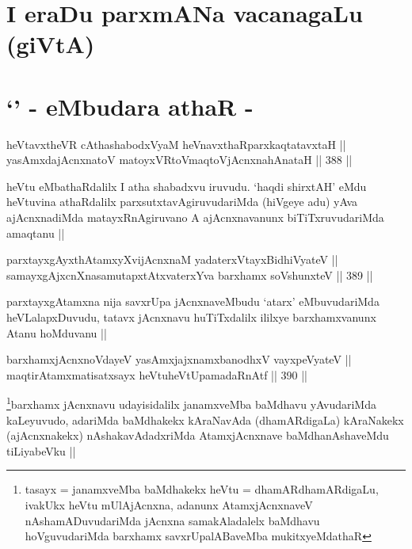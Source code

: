 \section*{I eraDu parxmANa vacanagaLu (giVtA)}

\section*{`\stext' - eMbudara athaR -}

\begin{shl}
heVtavxtheVR cAthashabodxV\s yaM heVnavxthaRparxkaqtatavxtaH || \\
yasAmxdajAcnxnatoV matoyxVR\s toV\s maqtoV\s jAcnxnahAnataH ||  388 ||  
\end{shl}

\begin{artha}
heVtu eMbathaRdalilx I atha shabadxvu iruvudu. `haqdi shirxtAH' eMdu
heVtuvina athaRdalilx parxsutxtavAgiruvudariMda (hiVgeye adu) yAva
ajAcnxnadiMda matayxRnAgiruvano A ajAcnxnavanunx biTiTxruvudariMda
amaqtanu ||
\end{artha}


\begin{shl}
parxtayxgAyxthAtamxyXvijAcnxnaM yadaterxVtayxBidhiVyateV || \\
samayxgAjxcnXnasamutapxtAtxvaterxYva barxhamx soV\s shunxteV ||  389 ||  
\end{shl}

\begin{artha}
parxtayxgAtamxna nija savxrUpa jAcnxnaveMbudu `atarx' eMbuvudariMda
heVLalapxDuvudu, tatavx jAcnxnavu huTiTxdalilx ililxye barxhamxvanunx
Atanu hoMduvanu ||
\end{artha}


\begin{shl}
barxhamxjAcnxnoVdayeV yasAmxjajxnamxbanodhxV vayxpeVyateV ||  \\
maqtirAtamxmatisatxsayx heVtuheVtUpamadaRnAtf ||  390 ||  
\end{shl}

\begin{artha}
\footnote{tasayx = janamxveMba baMdhakekx heVtu = dhamARdhamARdigaLu,
  ivakUkx heVtu mUlAjAcnxna, adanunx AtamxjAcnxnaveV
  nAshamADuvudariMda jAcnxna samakAladalelx baMdhavu hoVguvudariMda
  barxhamx savxrUpalABaveMba mukitxyeMdathaR}barxhamx jAcnxnavu udayisidalilx janamxveMba baMdhavu yAvudariMda
kaLeyuvudo, adariMda baMdhakekx kAraNavAda (dhamARdigaLa) kAraNakekx
(ajAcnxnakekx) nAshakavAdadxriMda AtamxjAcnxnave baMdhanAshaveMdu
tiLiyabeVku ||
\end{artha}

